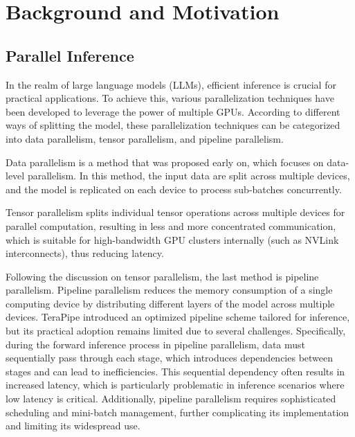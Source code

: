 \section{Background and Motivation}






\subsection{Parallel Inference}

In the realm of large language models (LLMs), efficient inference is crucial for practical applications. To achieve this, various parallelization techniques have been developed to leverage the power of multiple GPUs. According to different ways of splitting the model, these parallelization techniques can be categorized into data parallelism, tensor parallelism, and pipeline parallelism.


Data parallelism\cite{zinkevich2010parallelized,  dean2012large, krizhevsky2014weirdtrickparallelizingconvolutional, goyal2018accuratelargeminibatchsgd, ben2019demystifying} is a method that was proposed early on, which focuses on data-level parallelism. In this method, the input data are split across multiple devices, and the model is replicated on each device to process sub-batches concurrently. 

Tensor parallelism \cite{lu2017flexflow, shazeer2018mesh, shoeybi2019megatron, rajbhandari2020zero} splits individual tensor operations across multiple devices for parallel computation, resulting in less and more concentrated communication, which is suitable for high-bandwidth GPU clusters internally (such as NVLink interconnects), thus reducing latency. 

Following the discussion on tensor parallelism, the last method is pipeline parallelism\cite{petrowski1993performance, harlap2018pipedreamfastefficientpipeline, huang2019gpipe, kim2023bpipe, qi2023zerobubblepipelineparallelism, qi2024pipelineparallelismcontrollablememory}. Pipeline parallelism reduces the memory consumption of a single computing device by distributing different layers of the model across multiple devices. TeraPipe\cite{li2021terapipe} introduced an optimized pipeline scheme tailored for inference, but its practical adoption remains limited due to several challenges. Specifically, during the forward inference process in pipeline parallelism, data must sequentially pass through each stage, which introduces dependencies between stages and can lead to inefficiencies. This sequential dependency often results in increased latency, which is particularly problematic in inference scenarios where low latency is critical. Additionally, pipeline parallelism requires sophisticated scheduling and mini-batch management, further complicating its implementation and limiting its widespread use.

